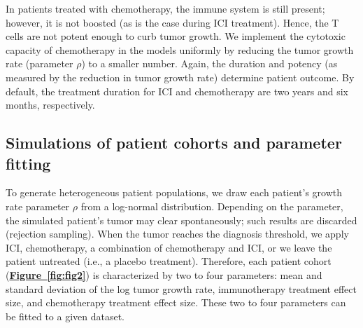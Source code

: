 \documentclass[a4paper,10pt]{article}
\newcommand{\myref}[2]{\hyperref[#1]{\bfseries Figure~\ref*{#1}#2}}
\begin{document}
In patients treated with chemotherapy, the immune system is still present; however, it is not
boosted (as is the case during ICI treatment). Hence, the T cells are not potent enough to curb tumor
growth. We implement the cytotoxic capacity of chemotherapy in the models uniformly
by reducing the tumor growth rate (parameter $\rho$) to a smaller number. Again, the duration and potency
(as measured by the reduction in tumor growth rate) determine patient outcome. By default, the treatment
duration for ICI and chemotherapy are two years and six months, respectively.

\subsection*{Simulations of patient cohorts and parameter fitting}

To generate heterogeneous patient populations, we draw each patient's growth rate
parameter $\rho$ from a log-normal distribution.
Depending on the parameter,
the simulated patient's tumor may clear spontaneously; such results are discarded 
(rejection sampling). When the tumor reaches the diagnosis threshold, we apply ICI, chemotherapy, 
a combination of chemotherapy and ICI, or we leave the patient untreated (i.e., a placebo treatment).
Therefore, each patient cohort (\myref{fig:fig2}{}) is characterized by two to four parameters:
mean and standard deviation of the log tumor growth rate, immunotherapy treatment effect
size, and chemotherapy treatment effect size. These two to four parameters can be fitted
to a given dataset. 
\end{document}

